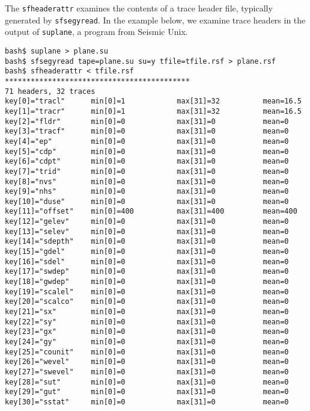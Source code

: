 \noindent\doublebox{\parbox{\textwidth}{

}}

The \texttt{sfheaderattr} examines the contents of a trace header file,
typically generated by \texttt{sfsegyread}. In the example below, we examine
trace headers in the output of \texttt{suplane}, a program from Seismic Unix.
\begin{verbatim}
bash$ suplane > plane.su
bash$ sfsegyread tape=plane.su su=y tfile=tfile.rsf > plane.rsf
bash$ sfheaderattr < tfile.rsf
*******************************************
71 headers, 32 traces
key[0]="tracl"      min[0]=1            max[31]=32          mean=16.5
key[1]="tracr"      min[0]=1            max[31]=32          mean=16.5
key[2]="fldr"       min[0]=0            max[31]=0           mean=0
key[3]="tracf"      min[0]=0            max[31]=0           mean=0
key[4]="ep"         min[0]=0            max[31]=0           mean=0
key[5]="cdp"        min[0]=0            max[31]=0           mean=0
key[6]="cdpt"       min[0]=0            max[31]=0           mean=0
key[7]="trid"       min[0]=0            max[31]=0           mean=0
key[8]="nvs"        min[0]=0            max[31]=0           mean=0
key[9]="nhs"        min[0]=0            max[31]=0           mean=0
key[10]="duse"      min[0]=0            max[31]=0           mean=0
key[11]="offset"    min[0]=400          max[31]=400         mean=400
key[12]="gelev"     min[0]=0            max[31]=0           mean=0
key[13]="selev"     min[0]=0            max[31]=0           mean=0
key[14]="sdepth"    min[0]=0            max[31]=0           mean=0
key[15]="gdel"      min[0]=0            max[31]=0           mean=0
key[16]="sdel"      min[0]=0            max[31]=0           mean=0
key[17]="swdep"     min[0]=0            max[31]=0           mean=0
key[18]="gwdep"     min[0]=0            max[31]=0           mean=0
key[19]="scalel"    min[0]=0            max[31]=0           mean=0
key[20]="scalco"    min[0]=0            max[31]=0           mean=0
key[21]="sx"        min[0]=0            max[31]=0           mean=0
key[22]="sy"        min[0]=0            max[31]=0           mean=0
key[23]="gx"        min[0]=0            max[31]=0           mean=0
key[24]="gy"        min[0]=0            max[31]=0           mean=0
key[25]="counit"    min[0]=0            max[31]=0           mean=0
key[26]="wevel"     min[0]=0            max[31]=0           mean=0
key[27]="swevel"    min[0]=0            max[31]=0           mean=0
key[28]="sut"       min[0]=0            max[31]=0           mean=0
key[29]="gut"       min[0]=0            max[31]=0           mean=0
key[30]="sstat"     min[0]=0            max[31]=0           mean=0

\end{verbatim}
